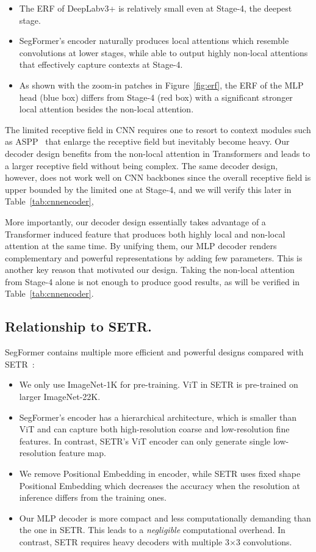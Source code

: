 \vspace{-0.1cm}
\begin{itemize}[leftmargin=*]
    \item The ERF of DeepLabv3+ is relatively small even at Stage-4, the deepest stage.
    \item SegFormer's encoder naturally produces local attentions which resemble convolutions at lower stages, while able to output highly non-local attentions that effectively capture contexts at Stage-4.
    \item As shown with the zoom-in patches in Figure~\ref{fig:erf}, the ERF of the MLP head (blue box) differs from Stage-4 (red box) with a significant stronger local attention besides the non-local attention.
\end{itemize}

The limited receptive field in CNN requires one to resort to context modules such as ASPP~\cite{denseaspp} that enlarge the receptive field but inevitably become heavy. Our decoder design benefits from the non-local attention in Transformers and leads to a larger receptive field without being complex. The same decoder design, however, does not work well on CNN backbones since the overall receptive field is upper bounded by the limited one at Stage-4, and we will verify this later in Table~\ref{tab:cnnencoder},

More importantly, our decoder design essentially takes advantage of a Transformer induced feature that produces both highly local and non-local attention at the same time. By unifying them, our MLP decoder renders complementary and powerful representations by adding few parameters. This is another key reason that motivated our design. Taking the non-local attention from Stage-4 alone is not enough to produce good results, as will be verified in Table~\ref{tab:cnnencoder}.


\subsection{Relationship to SETR.} 
SegFormer contains multiple more efficient and powerful designs compared with SETR~\cite{setr}:

\vspace{-0.1cm}
\begin{itemize}[leftmargin=*]
\item We only use ImageNet-1K for pre-training. ViT in SETR is pre-trained on larger ImageNet-22K. 
\item SegFormer's encoder has a hierarchical architecture, which is smaller than ViT and can capture both high-resolution coarse and low-resolution fine features. In contrast, SETR's ViT encoder can only generate single low-resolution feature map.
\item We remove Positional Embedding in encoder, while SETR uses fixed shape Positional Embedding which decreases the accuracy when the resolution at inference differs from the training ones. 
\item Our MLP decoder is more compact and less computationally demanding than the one in SETR. This leads to a \textit{negligible} computational overhead. In contrast, SETR requires heavy decoders with multiple 3$\times$3 convolutions.  
\end{itemize}
